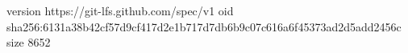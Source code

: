 version https://git-lfs.github.com/spec/v1
oid sha256:6131a38b42cf57d9cf417d2e1b717d7db6b9c07c616a6f45373ad2d5add2456c
size 8652
